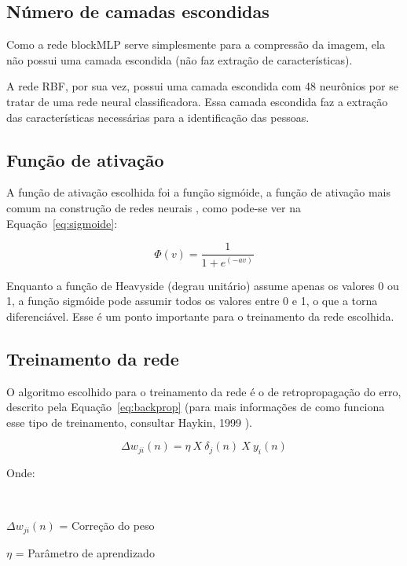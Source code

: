 \documentclass[hidelinks,11pt,twocolumn]{article}
\begin{document}
\subsection{Número de camadas escondidas}

Como a rede blockMLP serve simplesmente para a compressão da imagem, ela não possui uma camada escondida (não faz extração de características).

A rede RBF, por sua vez, possui uma camada escondida com 48 neurônios por se tratar de uma rede neural classificadora. Essa camada escondida faz a extração das características necessárias para a identificação das pessoas.

\subsection{Função de ativação}

A função de ativação escolhida foi a função sigmóide, a função de ativação mais comum na construção de redes neurais \cite{haykin}, como pode-se ver na Equação~\ref{eq:sigmoide}:

\begin{equation}
\Phi(v) = \dfrac{1}{1+e^{(-av)}}
\label{eq:sigmoide}
\end{equation}

Enquanto a função de Heavyside (degrau unitário) assume apenas os valores 0 ou 1, a função sigmóide pode assumir todos os valores entre 0 e 1, o que a torna diferenciável. Esse é um ponto importante para o treinamento da rede escolhida.

\subsection{Treinamento da rede}

O algoritmo escolhido para o treinamento da rede é o de retropropagação do erro, descrito pela Equação~\ref{eq:backprop} (para mais informações de como funciona esse tipo de treinamento, consultar Haykin, 1999 \cite{haykin}). 

\begin{equation}
\Delta w_{ji}(n) = \eta \ X \ \delta_{j}(n) \ X \ y_{i}(n)
\label{eq:backprop}
\end{equation}

Onde:

\

$\Delta w_{ji}(n)$ = Correção do peso

$\eta$ = Parâmetro de aprendizado
\end{document}
